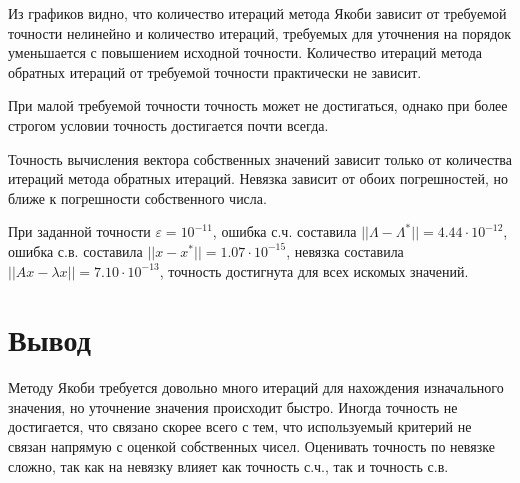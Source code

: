 \documentclass[11pt,a4paper]{article}
\let\epsilon\varepsilon
\renewcommand\;{\hspace{1cm}}
\begin{document}
Из графиков видно, что количество итераций метода Якоби зависит от требуемой точности нелинейно и количество итераций, требуемых для уточнения на порядок уменьшается с повышением исходной точности.
Количество итераций метода обратных итераций от требуемой точности практически не зависит.

При малой требуемой точности точность может не достигаться, однако при более строгом условии точность достигается почти всегда.

Точность вычисления вектора собственных значений зависит только от количества итераций метода обратных итераций.
Невязка зависит от обоих погрешностей, но ближе к погрешности собственного числа.

При заданной точности $\epsilon = 10^{-11}$, ошибка с.ч. составила $||\Lambda - \Lambda^{*}|| = 4.44 \cdot 10^{-12}$, ошибка с.в. составила $||x - x^{*}|| = 1.07 \cdot 10^{-15}$, невязка составила $||Ax - \lambda x|| = 7.10\cdot10^{-13}$, точность достигнута для всех искомых значений.
\section{Вывод}
Методу Якоби требуется довольно много итераций для нахождения изначального значения, но уточнение значения происходит быстро.
Иногда точность не достигается, что связано скорее всего с тем, что используемый критерий не связан напрямую с оценкой собственных чисел. Оценивать точность по невязке сложно, так как на невязку влияет как точность с.ч., так и точность с.в.
\end{document}
